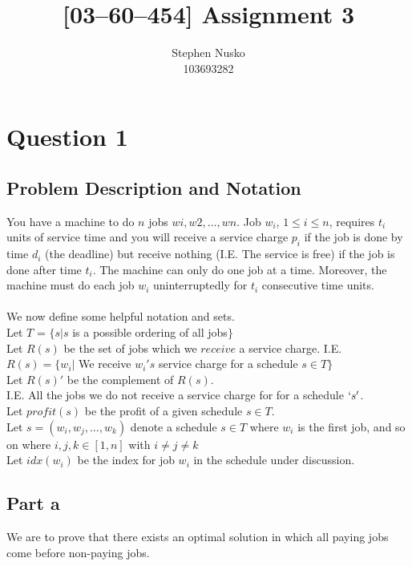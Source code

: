 \documentclass{article}
\title{[03--60--454] Assignment 3}
\author{Stephen Nusko \\ 103693282}
\begin{document}
	\thispagestyle{empty}
	\maketitle	
  \section{Question 1}
    \subsection{Problem Description and Notation}
    You have a machine to do $n$ jobs $wi, w2, \ldots , wn$. Job $w_{i}$, $1 \leq i \leq n$, 
    requires $t_{i}$ units of service time and you will receive a service charge $p_{i}$ if the job is done by time $d_{i}$ (the deadline) 
    but receive nothing (I.E. The service is free) if the job is done after time $t_{i}$. 
    The machine can only do one job at a time. 
    Moreover, the machine must do each job $w_{i}$ uninterruptedly for $t_{i}$ consecutive time units.
    \\
    \\
    We now define some helpful notation and sets. \\
    Let $T$ = $\{ s | s$ is a possible ordering of all jobs$\}$ \\
    Let $R(s)$ be the set of jobs which we $receive$ a service charge. I.E. $R(s) = \{ w_{i} |$ We receive $w_{i}'s$ service charge for a schedule $s \in T\}$ \\
    Let $R(s)'$ be the complement of $R(s)$.\\
    I.E. All the jobs we do not receive a service charge for for a schedule $`s'$. \\
    Let $profit(s)$ be the profit of a given schedule $s \in T$. \\
    Let $s = (w_{i}, w_{j}, \ldots, w_{k})$ denote a schedule $s \in T$ where $w_{i}$ is the first job, and so on where $i,j,k \in [1, n]$ with $i \neq j \neq k$ \\
    Let $idx(w_{i})$ be the index for job $w_{i}$ in the schedule under discussion. \\
    \subsection{Part a}
        We are to prove that there exists an optimal solution in which all paying jobs come before non-paying jobs. \\
\end{document}
